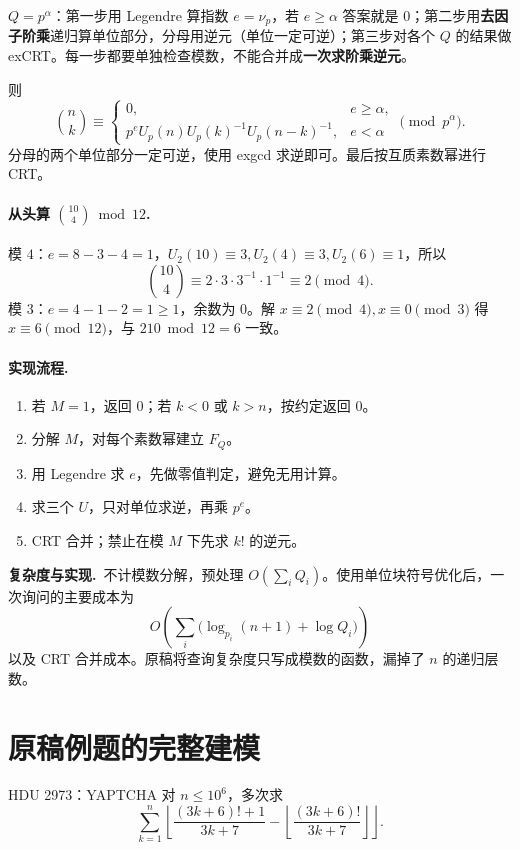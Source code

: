 \documentclass[UTF8,a4paper,11pt,twoside,openright,fontset=fandol]{ctexbook}
\theoremstyle{definition}
\newcommand{\floor}[1]{\left\lfloor #1\right\rfloor}
\newcommand{\cost}{\par\noindent\textbf{复杂度与实现.}\ }
\begin{document}
\begin{tip}[三步流程]
$Q=p^\alpha$：第一步用 Legendre 算指数 $e=\nu_p$，若 $e\ge\alpha$ 答案就是 $0$；第二步用\textbf{去因子阶乘}递归算单位部分，分母用逆元（单位一定可逆）；第三步对各个 $Q$ 的结果做 exCRT。每一步都要单独检查模数，不能合并成\textbf{一次求阶乘逆元}。
\end{tip}

则
\[
\binom nk\equiv
\begin{cases}
0,&e\ge\alpha,\\
p^eU_p(n)U_p(k)^{-1}U_p(n-k)^{-1},&e<\alpha
\end{cases}\pmod{p^\alpha}.
\]
分母的两个单位部分一定可逆，使用 exgcd 求逆即可。最后按互质素数幂进行 CRT。


\paragraph{从头算 $\binom{10}{4}\bmod12$.}
模 $4$：$e=8-3-4=1$，$U_2(10)\equiv3,U_2(4)\equiv3,U_2(6)\equiv1$，所以
\[
 \binom{10}{4}\equiv2\cdot3\cdot3^{-1}\cdot1^{-1}\equiv2\pmod4.
\]
模 $3$：$e=4-1-2=1\ge1$，余数为 $0$。解 $x\equiv2\pmod4,x\equiv0\pmod3$ 得 $x\equiv6\pmod{12}$，与 $210\bmod12=6$ 一致。

\paragraph{实现流程.}
\begin{enumerate}
\item 若 $M=1$，返回 $0$；若 $k<0$ 或 $k>n$，按约定返回 $0$。
\item 分解 $M$，对每个素数幂建立 $F_Q$。
\item 用 Legendre 求 $e$，先做零值判定，避免无用计算。
\item 求三个 $U$，只对单位求逆，再乘 $p^e$。
\item CRT 合并；禁止在模 $M$ 下先求 $k!$ 的逆元。
\end{enumerate}
\cost 不计模数分解，预处理 $O(\sum_iQ_i)$。使用单位块符号优化后，一次询问的主要成本为
\[
O\!\left(\sum_i\bigl(\log_{p_i}(n+1)+\log Q_i\bigr)\right)
\]
以及 CRT 合并成本。原稿将查询复杂度只写成模数的函数，漏掉了 $n$ 的递归层数。


\section{原稿例题的完整建模}
\begin{problem}{HDU 2973：YAPTCHA}
对 $n\le10^6$，多次求
\[
\sum_{k=1}^n\floor{\frac{(3k+6)!+1}{3k+7}-\floor{\frac{(3k+6)!}{3k+7}}}.
\]
\end{problem}
\end{document}
